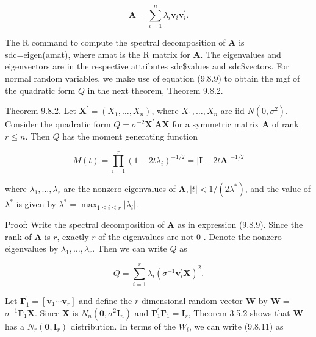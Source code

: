 \begin{equation*}
\mathbf{A}=\sum_{i=1}^{n} \lambda_{i} \mathbf{v}_{i} \mathbf{v}_{i}^{\prime} . \tag{9.8.9}
\end{equation*}


The R command to compute the spectral decomposition of $\mathbf{A}$ is sdc=eigen(amat), where amat is the R matrix for $\mathbf{A}$. The eigenvalues and eigenvectors are in the respective attributes sdc\$values and sdc\$vectors. For normal random variables, we make use of equation (9.8.9) to obtain the mgf of the quadratic form $Q$ in the next theorem, Theorem 9.8.2.

Theorem 9.8.2. Let $\mathbf{X}^{\prime}=\left(X_{1}, \ldots, X_{n}\right)$, where $X_{1}, \ldots, X_{n}$ are iid $N\left(0, \sigma^{2}\right)$. Consider the quadratic form $Q=\sigma^{-2} \mathbf{X}^{\prime} \mathbf{A X}$ for a symmetric matrix $\mathbf{A}$ of rank $r \leq n$. Then $Q$ has the moment generating function


\begin{equation*}
M(t)=\prod_{i=1}^{r}\left(1-2 t \lambda_{i}\right)^{-1 / 2}=|\mathbf{I}-2 t \mathbf{A}|^{-1 / 2} \tag{9.8.10}
\end{equation*}


where $\lambda_{1}, \ldots, \lambda_{r}$ are the nonzero eigenvalues of $\mathbf{A},|t|<1 /\left(2 \lambda^{*}\right)$, and the value of $\lambda^{*}$ is given by $\lambda^{*}=\max _{1 \leq i \leq r}\left|\lambda_{i}\right|$.

Proof: Write the spectral decomposition of $\mathbf{A}$ as in expression (9.8.9). Since the rank of $\mathbf{A}$ is $r$, exactly $r$ of the eigenvalues are not 0 . Denote the nonzero eigenvalues by $\lambda_{1}, \ldots, \lambda_{r}$. Then we can write $Q$ as


\begin{equation*}
Q=\sum_{i=1}^{r} \lambda_{i}\left(\sigma^{-1} \mathbf{v}_{i}^{\prime} \mathbf{X}\right)^{2} . \tag{9.8.11}
\end{equation*}


Let $\boldsymbol{\Gamma}_{1}^{\prime}=\left[\mathbf{v}_{1} \cdots \mathbf{v}_{r}\right]$ and define the $r$-dimensional random vector $\mathbf{W}$ by $\mathbf{W}=$ $\sigma^{-1} \boldsymbol{\Gamma}_{1} \mathbf{X}$. Since $\mathbf{X}$ is $N_{n}\left(\mathbf{0}, \sigma^{2} \mathbf{I}_{n}\right)$ and $\boldsymbol{\Gamma}_{1}^{\prime} \boldsymbol{\Gamma}_{1}=\mathbf{I}_{r}$, Theorem 3.5.2 shows that $\mathbf{W}$ has a $N_{r}\left(\mathbf{0}, \mathbf{I}_{r}\right)$ distribution. In terms of the $W_{i}$, we can write (9.8.11) as


